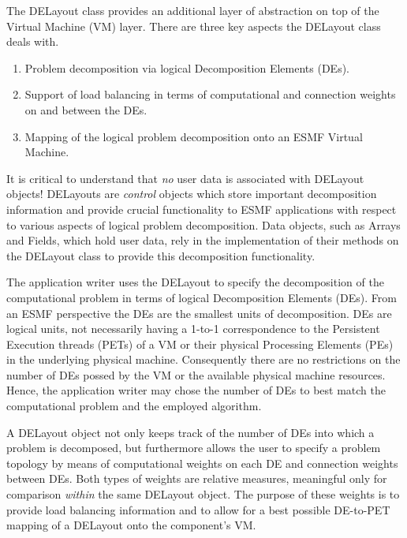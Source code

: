 
The DELayout class provides an additional layer of abstraction on top of the
Virtual Machine (VM) layer. There are three key aspects the DELayout class deals
with.

\begin{enumerate}

\item Problem decomposition via logical Decomposition Elements (DEs).

\item Support of load balancing in terms of computational and connection weights
on and between the DEs. 

\item Mapping of the logical problem decomposition onto an ESMF Virtual Machine.

\end{enumerate}

It is critical to understand that {\it no} user data is associated with DELayout
objects! DELayouts are {\it control} objects which store important decomposition
information and provide crucial functionality to ESMF applications with respect
to various aspects of logical problem decomposition. Data objects, such as Arrays
and Fields, which hold user data, rely in the implementation of their methods on
the DELayout class to provide this decomposition functionality.

The application writer uses the DELayout to specify the decomposition of the
computational problem in terms of logical Decomposition Elements (DEs). From an
ESMF perspective the DEs are the smallest units of decomposition. DEs are logical
units, not necessarily having a 1-to-1 correspondence to the Persistent Execution
threads (PETs) of a VM or their physical Processing Elements (PEs) in the
underlying physical machine. Consequently there are no restrictions on the number
of DEs possed by the VM or the available physical machine resources. Hence,
the application writer may chose the number of DEs to best match the
computational problem and the employed algorithm.

A DELayout object not only keeps track of the number of DEs into which a problem
is decomposed, but furthermore allows the user to specify a problem topology by
means of computational weights on each DE and connection weights between DEs.
Both types of weights are relative measures, meaningful only for comparison
{\it within} the same DELayout object. The purpose of these weights is to provide
load balancing information and to allow for a best possible DE-to-PET mapping of
a DELayout onto the component's VM.

